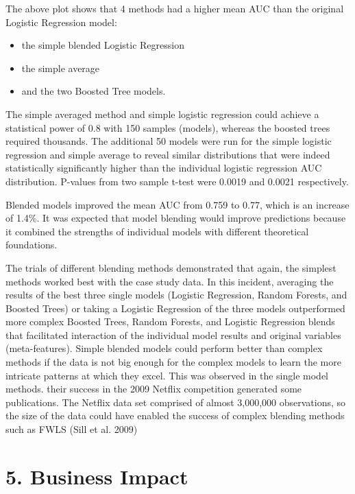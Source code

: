 \documentclass[]{elsarticle} %
\providecommand{\tightlist}{%
  \setlength{\itemsep}{0pt}\setlength{\parskip}{0pt}}
\begin{document}
The above plot shows that 4 methods had a higher mean AUC than the
original Logistic Regression model:

\begin{itemize}
\tightlist
\item
  the simple blended Logistic Regression
\item
  the simple average
\item
  and the two Boosted Tree models.
\end{itemize}

The simple averaged method and simple logistic regression could achieve
a statistical power of 0.8 with 150 samples (models), whereas the
boosted trees required thousands. The additional 50 models were run for
the simple logistic regression and simple average to reveal similar
distributions that were indeed statistically significantly higher than
the individual logistic regression AUC distribution. P-values from two
sample t-test were 0.0019 and 0.0021 respectively.

Blended models improved the mean AUC from 0.759 to 0.77, which is an
increase of 1.4\%. It was expected that model blending would improve
predictions because it combined the strengths of individual models with
different theoretical foundations.

The trials of different blending methods demonstrated that again, the
simplest methods worked best with the case study data. In this incident,
averaging the results of the best three single models (Logistic
Regression, Random Forests, and Boosted Trees) or taking a Logistic
Regression of the three models outperformed more complex Boosted Trees,
Random Forests, and Logistic Regression blends that facilitated
interaction of the individual model results and original variables
(meta-features). Simple blended models could perform better than complex
methods if the data is not big enough for the complex models to learn
the more intricate patterns at which they excel. This was observed in
the single model methods. their success in the 2009 Netflix competition
generated some publications. The Netflix data set comprised of almost
3,000,000 observations, so the size of the data could have enabled the
success of complex blending methods such as FWLS (Sill et al. 2009)

\section{5. Business Impact}\label{business-impact}
\end{document}
